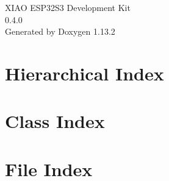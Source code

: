 \documentclass[twoside]{book}
\newcommand{\+}{\discretionary{\mbox{\scriptsize$\hookleftarrow$}}{}{}}
\newcommand{\clearemptydoublepage}{%
    \newpage{\pagestyle{empty}\cleardoublepage}%
  }
\begin{document}
  \raggedbottom
    \hypersetup{pageanchor=false,
                bookmarksnumbered=true,
                pdfencoding=unicode
               }
  \begin{titlepage}
  \vspace*{7cm}
  \begin{center}%
  {\Large XIAO ESP32\+S3 Development Kit}\\
  [1ex]\large 0.\+4.\+0 \\
  \vspace*{1cm}
  {\large Generated by Doxygen 1.13.2}\\
  \end{center}
  \end{titlepage}
  \clearemptydoublepage
  \tableofcontents
  \clearemptydoublepage
  \hypersetup{pageanchor=true}
\chapter{Hierarchical Index}

\chapter{Class Index}

\chapter{File Index}

\end{document}
